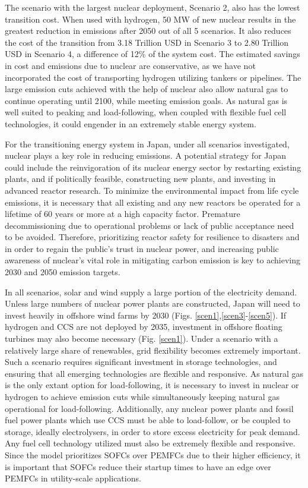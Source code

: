 The scenario with the largest nuclear deployment, Scenario 2, also has the lowest transition cost. When used with hydrogen, 50 MW of new nuclear results in the greatest reduction in emissions after 2050 out of all 5 scenarios. It also reduces the cost of the transition from 3.18 Trillion USD in Scenario 3 to 2.80 Trillion USD in Scenario 4, a difference of 12\% of the system cost. The estimated savings in cost and emissions due to nuclear are conservative, as we have not incorporated the cost of transporting hydrogen utilizing tankers or pipelines. The large emission cuts achieved with the help of nuclear also allow natural gas to continue operating until 2100, while meeting emission goals. As natural gas is well suited to peaking and load-following, when coupled with flexible fuel cell technologies, it could engender in an extremely stable energy system. 

For the transitioning energy system in Japan, under all scenarios investigated, nuclear plays a key role in reducing emissions. A potential strategy for Japan could include the reinvigoration of its nuclear energy sector by restarting existing plants, and if politically feasible, constructing new plants, and investing in advanced reactor research. To minimize the environmental impact from life cycle emissions, it is necessary that all existing and any new reactors be operated for a lifetime of 60 years or more at a high capacity factor. Premature decommissioning due to operational problems or lack of public acceptance need to be avoided. Therefore, prioritizing reactor safety for resilience to disasters and in order to regain the public's trust in nuclear power, and increasing public awareness of nuclear's vital role in mitigating carbon emission is key to achieving 2030 and 2050 emission targets.

In all scenarios, solar and wind supply a large portion of the electricity demand. Unless large numbers of nuclear power plants are constructed, Japan will need to invest heavily in offshore wind farms by 2030 (Figs. \ref{scen1},\ref{scen3}-\ref{scen5}). If hydrogen and CCS are not deployed by 2035, investment in offshore floating turbines may also become necessary (Fig. \ref{scen1}). Under a scenario with a relatively large share of renewables, grid flexibility becomes extremely important. Such a scenario requires significant investment in storage technologies, and ensuring that all emerging technologies are flexible and responsive. As natural gas is the only extant option for load-following, it is necessary to invest in nuclear or hydrogen to achieve emission cuts while simultaneously keeping natural gas operational for load-following. Additionally, any nuclear power plants and fossil fuel power plants which use CCS must be able to load-follow, or be coupled to storage, ideally electrolysers, in order to store excess electricity for peak demand. Any fuel cell technology utilized must also be extremely flexible and responsive. Since the model prioritizes \gls{SOFC}s over \gls{PEMFC}s due to their higher efficiency, it is important that \gls{SOFC}s reduce their startup times to have an edge over \gls{PEMFC}s in utility-scale applications.

